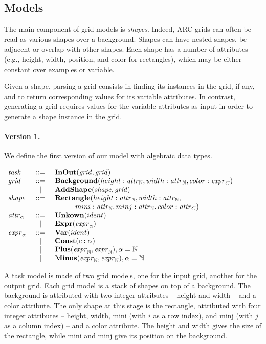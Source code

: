 \documentclass[a4paper]{llncs}
\newenvironment{datatype}{$\begin{array}{lcl}}{\end{array}$}
\newcommand{\is}{&\ ::=\ &}
\newcommand{\altis}{\\ &\ \mid\ &}
\newcommand{\nat}{\mathbb{N}}
\begin{document}
\subsection{Models}
\label{model}

The main component of grid models is {\em shapes}. Indeed, ARC grids
can often be read as various shapes over a background. Shapes can have
nested shapes, be adjacent or overlap with other shapes. Each shape
has a number of attributes (e.g., height, width, position, and color
for rectangles), which may be either constant over examples or
variable.

Given a shape, parsing a grid consists in finding its instances in the
grid, if any, and to return corresponding values for its variable
attributes. In contrast, generating a grid requires values for the
variable attributes as input in order to generate a shape instance in
the grid.

\paragraph{Version 1.} We define the first version of our model with
algebraic data types. 

\begin{center}
\begin{datatype}
  {\it task} \is {\bf InOut}({\it grid}, {\it grid})
  \\
  {\it grid} \is {\bf Background}(height: {\it attr}_\nat, width: {\it attr}_\nat, color: {\it expr}_C)
  \altis {\bf AddShape}({\it shape}, {\it grid})
  \\
  {\it shape} \is {\bf Rectangle}(height: {\it attr}_\nat, width: {\it attr}_\nat,\\
  & & \hspace*{1cm} mini: {\it attr}_\nat, minj: {\it attr}_\nat, color: {\it attr}_C)
  \\
  {\it attr}_\alpha \is {\bf Unkown}(ident)
  \altis {\bf Expr}({\it expr}_\alpha)
  \\
  {\it expr}_\alpha \is {\bf Var}(ident)
  \altis {\bf Const}(c: \alpha)
  \altis {\bf Plus}({\it expr}_\nat, {\it expr}_\nat), \alpha = \nat
  \altis {\bf Minus}({\it expr}_\nat, {\it expr}_\nat), \alpha = \nat
\end{datatype}
\end{center}

A task model is made of two grid models, one for the input grid,
another for the output grid.
%
Each grid model is a stack of shapes on top of a background. The
background is attributed with two integer attributes -- height and
width -- and a color attribute.
%
The only shape at this stage is the rectangle, attributed with four
integer attributes -- height, width, mini (with $i$ as a row index),
and minj (with $j$ as a column index) -- and a color attribute. The
height and width gives the size of the rectangle, while mini and minj
give its position on the background.
\end{document}

